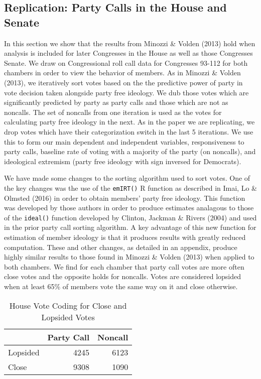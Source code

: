 \documentclass[12pt]{article}
\begin{document}
\subsection{Replication: Party Calls in the House and Senate}

In this section we show that the results from Minozzi \& Volden (2013) hold when analysis is included for later Congresses in the House as well as those Congresses Senate. We draw on Congressional roll call data for Congresses 93-112 for both chambers in order to view the behavior of members. As in Minozzi \& Volden (2013), we iteratively sort votes based on the the predictive power of party in vote decision taken alongside party free ideology. We dub those votes which are significantly predicted by party as party calls and those which are not as noncalls. The set of noncalls from one iteration is used as the votes for calculating party free ideology in the next. As in the paper we are replicating, we drop votes which have their categorization switch in the last 5 iterations. We use this to form our main dependent and independent variables, responsiveness to party calls, baseline rate of voting with a majority of the party (on noncalls), and ideological extremism (party free ideology with sign inversed for Democrats).

We have made some changes to the sorting algorithm used to sort votes. One of the key changes was the use of the \verb|emIRT()| R function as described in Imai, Lo \& Olmsted (2016) in order to obtain members' party free ideology. This function was developed by those authors in order to produce estimates analagous to those of the \verb|ideal()| function developed by Clinton, Jackman \& Rivers (2004) and used in the prior party call sorting algorithm. A key advantage of this new function for estimation of member ideology is that it produces results with greatly reduced computation. These and other changes, as detailed in an appendix, produce highly similar results to those found in Minozzi \& Volden (2013) when applied to both chambers. We find for each chamber that party call votes are more often close votes and the opposite holds for noncalls. Votes are considered lopsided when at least 65\% of members vote the same way on it and close otherwise. 

\begin{table}[H]
	\centering
	\caption{House Vote Coding for Close and Lopsided Votes} 
	\begin{tabular}{lrr}
		\hline
		& Party Call & Noncall \\ 
		\hline
		Lopsided & 4245 & 6123 \\ 
		Close & 9308 & 1090 \\ 
		\hline
	\end{tabular}
\end{table}
\end{document}
